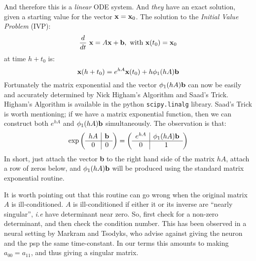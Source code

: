 And therefore this is a {\em linear} ODE system. And {\em they} have an
exact solution, given a starting value for the vector
$\mbox{\bf x} =\mbox{\bf x}_0$. The solution to the {\em Initial Value
  Problem} (IVP):
\[\frac{d}{dt}~\mbox{\bf x} = A \mbox{\bf x} + \mbox{\bf
    b},~\mbox{with}~\mbox{\bf x}(t_0) = \mbox{\bf x}_0\]
at time $h+t_0$ is:
\[\mbox{\bf x}(h+t_0) = e^{h A} \mbox{\bf x}(t_0) +h\phi_1(h A)
  \mbox{\bf b}\] Fortunately the matrix exponential and the vector
$\phi_1(h A) \mbox{\bf b}$ can now be easily and accurately determined
by Nick Higham's Algorithm and Saad's Trick. Higham's Algorithm is
available in the python {\tt scipy.linalg} library. Saad's Trick is
worth mentioning; if we have a matrix exponential function, then we
can construct both $e^{h A}$ and $\phi_1(h A) \mbox{\bf b}$
simultaneously. The observation is that:
\[\exp \left(\begin{array}[c]{c|c} hA & \mbox{\bf b}\\ \hline 0 & 0\end{array}\right) = 
  \left(\begin{array}[c]{c|c} e^{hA} & \phi_1(h A) \mbox{\bf b}\\
      \hline 0 & 1\end{array}\right) \] In short, just attach the
vector \mbox{\bf b} to the right hand side of the matrix $h A$, attach a
row of zeros below, and $\phi_1(h A) \mbox{\bf b}$ will be produced
using the standard matrix exponential routine.

It is worth pointing out that this routine can go wrong when the
original matrix $A$ is ill-conditioned. $A$ is ill-conditioned if
either it or its inverse are ``nearly singular'', {\it i.e} have
determinant near zero. So, first check for a non-zero determinant, and
then check the condition number. This has been observed in a neural
setting by Markram and Tsodyks, who advise against giving the neuron
and the psp the same time-constant. In our terms this amounts to
making $a_{00}=a_{11}$, and thus giving a singular matrix.

